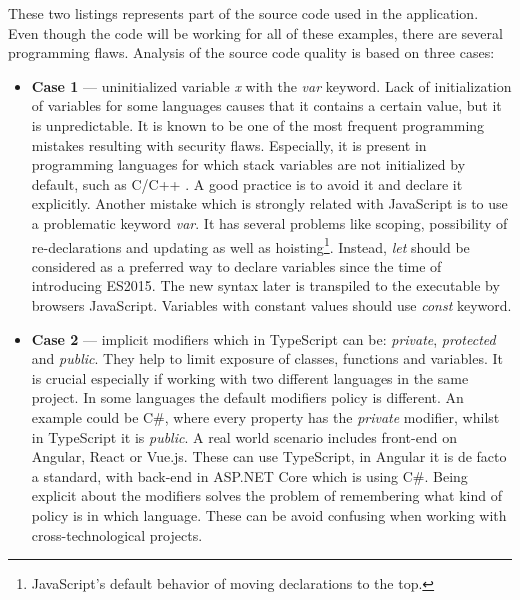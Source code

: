 \documentclass{article} %
\begin{document}
These two listings represents part of the source code used in the application. Even though the code will be working for all of these examples, there are several programming flaws. Analysis of the source code quality is based on three cases:
\begin{itemize}
    \item \textbf{Case 1} --- uninitialized variable \textit{x} with the \textit{var} keyword. Lack of initialization of variables for some languages causes that it contains a certain value, but it is unpredictable. It is known to be one of the most frequent programming mistakes resulting with security flaws. Especially, it is present in programming languages for which stack variables are not initialized by default, such as C/C++ \cite{bib:cwe_variables}. A good practice is to avoid it and declare it explicitly. Another mistake which is strongly related with JavaScript is to use a problematic keyword \textit{var}. It has several problems like scoping, possibility of re-declarations and updating as well as hoisting\footnote{JavaScript's default behavior of moving declarations to the top.}. Instead, \textit{let} should be considered as a preferred way to declare variables since the time of introducing ES2015. The new syntax later is transpiled to the executable by browsers JavaScript. Variables with constant values should use \textit{const} keyword.
    \item \textbf{Case 2} --- implicit modifiers which in TypeScript can be: \textit{private}, \textit{protected} and \textit{public}. They help to limit exposure of classes, functions and variables. It is crucial especially if working with two different languages in the same project. In some languages the default modifiers policy is different. An example could be C\#, where every property has the \textit{private} modifier, whilst in TypeScript it is \textit{public}. A real world scenario includes front-end on Angular, React or Vue.js. These can use TypeScript, in Angular it is de facto a standard, with back-end in ASP.NET Core which is using C\#. Being explicit about the modifiers solves the problem of remembering what kind of policy is in which language. These can be avoid confusing when working with cross-technological projects.

\end{itemize}
\end{document}
